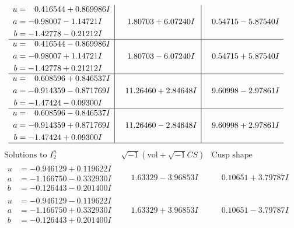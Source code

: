\documentclass[1p]{elsarticle_modified}
\theoremstyle{definition}
\newcommand{\I}{\sqrt{-1}}
\begin{document}
$$\begin{array}{c|c|c}
\begin{aligned}
u &= \phantom{-}0.416544 + 0.869986 I \\
a &= -0.98007 - 1.14721 I \\
b &= -1.42778 - 0.21212 I\end{aligned}
 & \phantom{-}1.80703 + 6.07240 I & \phantom{-}0.54715 - 5.87540 I \\ \hline\begin{aligned}
u &= \phantom{-}0.416544 - 0.869986 I \\
a &= -0.98007 + 1.14721 I \\
b &= -1.42778 + 0.21212 I\end{aligned}
 & \phantom{-}1.80703 - 6.07240 I & \phantom{-}0.54715 + 5.87540 I \\ \hline\begin{aligned}
u &= \phantom{-}0.608596 + 0.846537 I \\
a &= -0.914359 - 0.871769 I \\
b &= -1.47424 - 0.09300 I\end{aligned}
 & \phantom{-}11.26460 + 2.84648 I & \phantom{-}9.60998 - 2.97861 I \\ \hline\begin{aligned}
u &= \phantom{-}0.608596 - 0.846537 I \\
a &= -0.914359 + 0.871769 I \\
b &= -1.47424 + 0.09300 I\end{aligned}
 & \phantom{-}11.26460 - 2.84648 I & \phantom{-}9.60998 + 2.97861 I\\
 \hline 
 \end{array}$$\newpage$$\begin{array}{c|c|c}  
\text{Solutions to }I^u_{2}& \I (\text{vol} + \sqrt{-1}CS) & \text{Cusp shape}\\
 \hline 
\begin{aligned}
u &= -0.946129 + 0.119622 I \\
a &= -1.166750 - 0.332930 I \\
b &= -0.126443 - 0.201400 I\end{aligned}
 & \phantom{-}1.63329 - 3.96853 I & \phantom{-}0.10651 + 3.79787 I \\ \hline\begin{aligned}
u &= -0.946129 - 0.119622 I \\
a &= -1.166750 + 0.332930 I \\
b &= -0.126443 + 0.201400 I\end{aligned}
 & \phantom{-}1.63329 + 3.96853 I & \phantom{-}0.10651 - 3.79787 I \\ \hline\begin{aligned}

\end{aligned}
\end{array}$$
\end{document}
